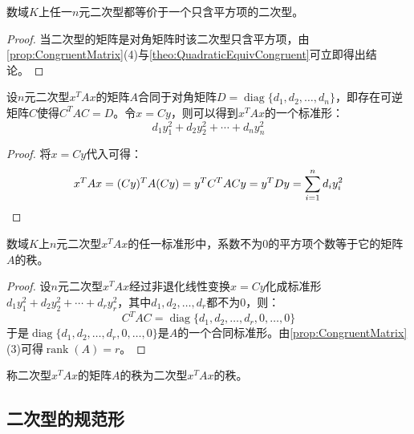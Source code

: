 \begin{theorem}
	数域$K$上任一$n$元二次型都等价于一个只含平方项的二次型。
\end{theorem}
\begin{proof}
	当二次型的矩阵是对角矩阵时该二次型只含平方项，由\cref{prop:CongruentMatrix}(4)与\cref{theo:QuadraticEquivCongruent}可立即得出结论。
\end{proof}
\begin{theorem}
	设$n$元二次型$x^TAx$的矩阵$A$合同于对角矩阵$D=\operatorname{diag}\{d_1,d_2,\dots,d_n\}$，即存在可逆矩阵$C$使得$C^TAC=D$。令$x=Cy$，则可以得到$x^TAx$的一个标准形：
	\begin{equation*}
		d_1y_1^2+d_2y_2^2+\cdots+d_ny_n^2
	\end{equation*}
\end{theorem}
\begin{proof}
	将$x=Cy$代入可得：
	\begin{equation*}
		x^TAx=(Cy)^TA(Cy)=y^TC^TACy=y^TDy=\sum_{i=1}^{n}d_iy_i^2\qedhere
	\end{equation*}
\end{proof}
\begin{theorem}
	数域$K$上$n$元二次型$x^TAx$的任一标准形中，系数不为$0$的平方项个数等于它的矩阵$A$的秩。
\end{theorem}
\begin{proof}
	设$n$元二次型$x^TAx$经过非退化线性变换$x=Cy$化成标准形$d_1y_1^2+d_2y_2^2+\cdots+d_ry_r^2$，其中$d_1,d_2,\dots,d_r$都不为$0$，则：
	\begin{equation*}
		C^TAC=\operatorname{diag}\{d_1,d_2,\dots,d_r,0,\dots,0\}
	\end{equation*}
	于是$\operatorname{diag}\{d_1,d_2,\dots,d_r,0,\dots,0\}$是$A$的一个合同标准形。由\cref{prop:CongruentMatrix}(3)可得$\operatorname{rank}(A)=r$。
\end{proof}
\begin{definition}
	称二次型$x^TAx$的矩阵$A$的秩为二次型$x^TAx$的秩。
\end{definition}

\subsection{二次型的规范形}
